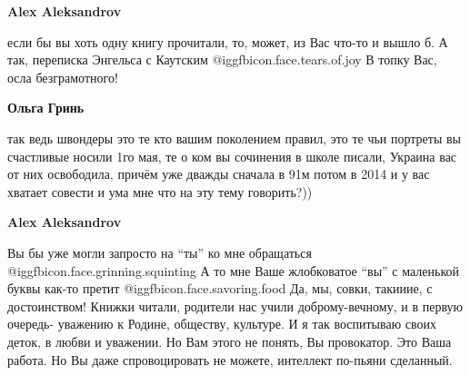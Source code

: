 \begin{itemize}
\begin{itemize}
\begin{itemize}
\textbf{Alex Aleksandrov} 

если бы вы хоть одну книгу прочитали, то, может, из Вас что-то и вышло б. А
так, переписка Энгельса с Каутским @igg{fbicon.face.tears.of.joy}  В топку Вас,
осла безграмотного!

\textbf{Ольга Гринь} 

так ведь швондеры это те кто вашим поколением правил, это те чьи портреты вы
счастливые носили 1го мая, те о ком вы сочинения в школе писали, Украина вас от
них освободила, причём уже дважды сначала в 91м потом в 2014 и у вас хватает
совести и ума мне что на эту тему говорить?))

\textbf{Alex Aleksandrov} 

Вы бы уже могли запросто на \enquote{ты} ко мне обращаться
@igg{fbicon.face.grinning.squinting}  А то мне Ваше жлобковатое \enquote{вы} с
маленькой буквы как-то претит @igg{fbicon.face.savoring.food}  Да, мы, совки,
такииие, с достоинством!  Книжки читали, родители нас учили доброму-вечному, и
в первую очередь- уважению к Родине, обществу, культуре. И я так воспитываю
своих деток, в любви и уважении. Но Вам этого не понять, Вы провокатор. Это
Ваша работа. Но Вы даже спровоцировать не можете, интеллект по-пьяни сделанный.

\end{itemize} %

\end{itemize} %

\end{itemize} %
